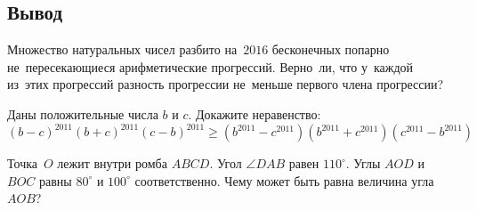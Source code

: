 \subsection*{Вывод}

\begin{problems}

\item
Множество натуральных чисел разбито на~$2016$ бесконечных попарно
не~пересекающиеся арифметические прогрессий.
Верно~ли, что у~каждой из~этих прогрессий разность прогрессии не~меньше первого
члена прогрессии?

\item
Даны положительные числа $b$ и $c$.
Докажите неравенство:
\[
    (b - c)^{2011} (b + c)^{2011} (c - b)^{2011}
\geq
    (b^{2011} - c^{2011}) (b^{2011} + c^{2011}) (c^{2011} - b^{2011})
\]

\item
Точка~$O$ лежит внутри ромба $ABCD$.
Угол $\angle DAB$ равен $110^{\circ}$.
Углы $AOD$ и $BOC$ равны $80^{\circ}$ и $100^{\circ}$ соответственно.
Чему может быть равна величина угла $AOB$?


\end{problems}

